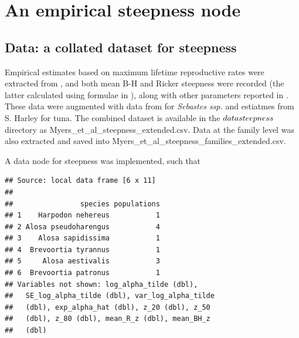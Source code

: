 \documentclass{dragonfly-report}
\begin{document}
\section{An empirical steepness node}

\subsection{Data: a collated dataset for steepness}

Empirical estimates based on maximum lifetime reproductive rates were extracted from \citet{myers_1999_maximum}, and both mean B-H and Ricker steepness were recorded (the latter calculated using formulae in \citet{michielsens_2004_bayesian}), along with other parameters reported in \citet{myers_1999_maximum}. These data were augmented with data from \citet{forrest2010hierarchical} for \emph{Sebastes ssp.} and estiatmes from S. Harley for tuna. The combined dataset is available in the $\/data\/steepness$ directory as Myers\_et\_al\_steepness\_extended.csv. Data at the family level was also extracted and saved into Myers\_et\_al\_steepness\_families\_extended.csv.




A data node for steepness was implemented, such that 
\begin{knitrout}
\color{fgcolor}\begin{kframe}
\begin{alltt}

\hlstd{(}\hlstd{)}

 \hlkwb{<-} \hlopt{$}\hlstd{(}\hlstd{)}
\hlstd{(}
\end{alltt}
\begin{verbatim}
## Source: local data frame [6 x 11]
## 
##                species populations
## 1    Harpodon nehereus           1
## 2 Alosa pseudoharengus           4
## 3    Alosa sapidissima           1
## 4  Brevoortia tyrannus           1
## 5     Alosa aestivalis           3
## 6  Brevoortia patronus           1
## Variables not shown: log_alpha_tilde (dbl),
##   SE_log_alpha_tilde (dbl), var_log_alpha_tilde
##   (dbl), exp_alpha_hat (dbl), z_20 (dbl), z_50
##   (dbl), z_80 (dbl), mean_R_z (dbl), mean_BH_z
##   (dbl)
\end{verbatim}
\end{kframe}
\end{knitrout}
\end{document}
